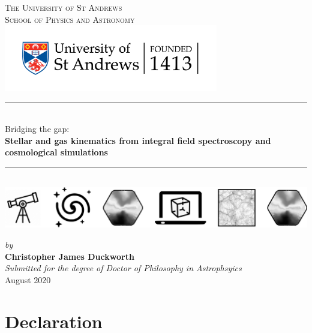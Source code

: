 \documentclass[11pt]{book}
\begin{document}
\pagestyle{empty}

\begin{titlepage}
\newcommand{\HRule}{\rule{\linewidth}{0.5mm}}
\center
\vspace*{0.3cm}
\textsc{\LARGE The University of St Andrews}\\[0.1cm] %
\textsc{\Large School of Physics and Astronomy}\\[3cm] %
\includegraphics[width=0.7\textwidth]{thesis/latex/st_a_logo_.png}

\HRule \\[0.4cm]
{ \LARGE Bridging the gap: \\} 
\textbf{Stellar and gas kinematics from integral field spectroscopy and cosmological simulations} \\[0.4cm] %
\HRule \\[1.6cm]
\vspace{-1.25cm}
\includegraphics[width=\textwidth]{thesis/latex/headers/icons_nobkgd.pdf}

\vspace{0.75cm}
\Large
\textsl{by} \\
\textbf{Christopher James Duckworth}
\\
\vspace*{0.75cm}
\textsl{\Large Submitted for the degree of Doctor of Philosophy in Astrophsyics}\\[0.6cm] %
{\Large {August 2020}}\\[3cm]
\vfill %

\end{titlepage}

\frontmatter

\chapter{Declaration}
\end{document}
